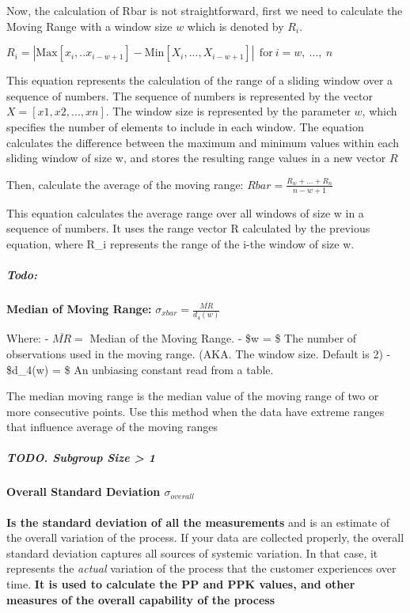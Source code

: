 \documentclass[11pt]{article}
\begin{document}
Now, the calculation of Rbar is not straightforward, first we need to
calculate the Moving Range with a window size \(w\) which is denoted by
\(R_i\).

\(R_i = | \text{Max}[x_{i}, .. x_{i-w+1}] - \text{Min}[X_i, ..., X_{i-w+1}]| \ \ \text{for} \ i=w, \ ..., \ n\)

This equation represents the calculation of the range of a sliding
window over a sequence of numbers. The sequence of numbers is
represented by the vector \(X = [x1, x2, ..., xn]\). The window size is
represented by the parameter \(w\), which specifies the number of
elements to include in each window. The equation calculates the
difference between the maximum and minimum values within each sliding
window of size w, and stores the resulting range values in a new vector
\(R\)

Then, calculate the average of the moving range:
\(Rbar = \frac{R_w + ... + R_n}{n-w+1}\)

This equation calculates the average range over all windows of size w in
a sequence of numbers. It uses the range vector R calculated by the
previous equation, where R\_i represents the range of the i-the window
of size w.

\hypertarget{todo}{%
\subparagraph{Todo:}\label{todo}}

\textbf{Median of Moving Range:}
\(\sigma_{xbar} = \frac{\overline{MR}}{d_4(w)}\)

Where: - \(\overline{MR} =\) Median of the Moving Range. - \$w = \$ The
number of observations used in the moving range. (AKA. The window size.
Default is 2) - \$d\_4(w) = \$ An unbiasing constant read from a table.

The median moving range is the median value of the moving range of two
or more consecutive points. Use this method when the data have extreme
ranges that influence average of the moving ranges

\hypertarget{todo.-subgroup-size-1}{%
\subparagraph{TODO. Subgroup Size \textgreater{}
1}\label{todo.-subgroup-size-1}}

\hypertarget{overall-standard-deviation-sigma_overall}{%
\paragraph{\texorpdfstring{Overall Standard Deviation
\(\sigma_{overall}\)}{Overall Standard Deviation \textbackslash sigma\_\{overall\}}}\label{overall-standard-deviation-sigma_overall}}

\textbf{Is the standard deviation of all the measurements} and is an
estimate of the overall variation of the process. If your data are
collected properly, the overall standard deviation captures all sources
of systemic variation. In that case, it represents the \emph{actual}
variation of the process that the customer experiences over time.
\textbf{It is used to calculate the PP and PPK values, and other
measures of the overall capability of the process}
\end{document}
